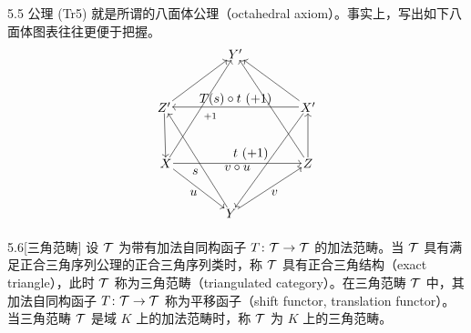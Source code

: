
\begin{remark}{5.5}
公理 (Tr5) 就是所谓的八面体公理（octahedral axiom）。事实上，写出如下八面体图表往往更便于把握。
\[
\begin{tikzpicture}[scale=0.92, every node/.style={inner sep=1pt}]
\node (Yp) at (0,2.66) {$Y'$};
\node (Zp) at (-2.13,1.06) {$Z'$};
\node (Xp) at (2.17,1.06) {$X'$};
\node (X)  at (-2.08,-0.63) {$X$};
\node (Z)  at (2.17,-0.63) {$Z$};
\node (Y)  at (-0.13,-2.13) {$Y$};
\draw[->] (Zp) -- (Yp);
\draw[->] (X)  -- (Yp);
\draw[->] (Xp) -- (Yp);
\draw[->] (Z)  -- (Yp);
\draw[->] (Xp) -- node[above] {$T(s)\circ t\ (+1)$} (Zp);
\draw[->] (Zp) -- (X);
\draw[->] (Z)  -- (Xp);
\draw[->] (X)  -- node[below] {$v\circ u$} (Z);
\draw[->] (X)  -- node[below left] {$u$} (Y);
\draw[->] (Y)  -- node[below right] {$v$} (Z);
\draw[->] (Y)  -- (Zp);
\draw[->] (Xp) -- (Y);
\node at (-1.20,-0.88) {$s$};
\node at (0.46,-0.34) {$t\ (+1)$};
\node at (-0.75,0.78) {$\scriptstyle +1$};
\end{tikzpicture}
\]
\end{remark}


\begin{definition}{5.6}[三角范畴]
设 $\mathcal{T}$ 为带有加法自同构函子 $T\colon\mathcal{T}\to\mathcal{T}$ 的加法范畴。当 $\mathcal{T}$ 具有满足正合三角序列公理的正合三角序列类时，称 $\mathcal{T}$ 具有正合三角结构（exact triangle），此时 $\mathcal{T}$ 称为三角范畴（triangulated category）。在三角范畴 $\mathcal{T}$ 中，其加法自同构函子 $T\colon\mathcal{T}\to\mathcal{T}$ 称为平移函子（shift functor, translation functor）。当三角范畴 $\mathcal{T}$ 是域 $K$ 上的加法范畴时，称 $\mathcal{T}$ 为 $K$ 上的三角范畴。
\end{definition}

